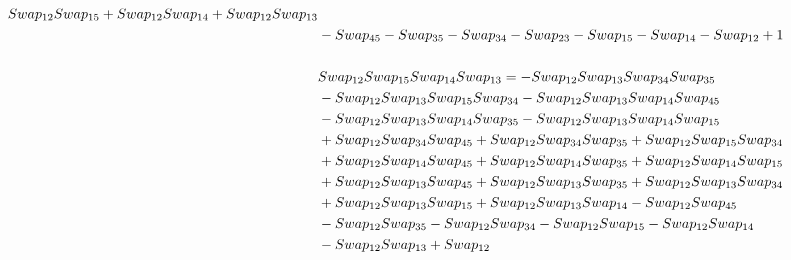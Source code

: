 \documentclass[10pt,a4paper]{amsart}
\begin{document}
\begin{align*}
        \textnormal{Swap}_{12} \textnormal{Swap}_{15} + \textnormal{Swap}_{12} \textnormal{Swap}_{14} + \textnormal{Swap}_{12} \textnormal{Swap}_{13}\\ & - \textnormal{Swap}_{45} - \textnormal{Swap}_{35} - \textnormal{Swap}_{34} - \textnormal{Swap}_{23} - \textnormal{Swap}_{15} - \textnormal{Swap}_{14} - \textnormal{Swap}_{12} +
        1\\
        \\
        &\textnormal{Swap}_{12}   \textnormal{Swap}_{15}   \textnormal{Swap}_{14}   \textnormal{Swap}_{13} = -\textnormal{Swap}_{12} \textnormal{Swap}_{13} \textnormal{Swap}_{34} \textnormal{Swap}_{35}\\ & - \textnormal{Swap}_{12} \textnormal{Swap}_{13} \textnormal{Swap}_{15} \textnormal{Swap}_{34} - \textnormal{Swap}_{12} \textnormal{Swap}_{13} \textnormal{Swap}_{14} \textnormal{Swap}_{45}\\ & - \textnormal{Swap}_{12} \textnormal{Swap}_{13} \textnormal{Swap}_{14} \textnormal{Swap}_{35} -
        \textnormal{Swap}_{12} \textnormal{Swap}_{13} \textnormal{Swap}_{14} \textnormal{Swap}_{15}\\ & + \textnormal{Swap}_{12} \textnormal{Swap}_{34} \textnormal{Swap}_{45} + \textnormal{Swap}_{12} \textnormal{Swap}_{34} \textnormal{Swap}_{35} + \textnormal{Swap}_{12} \textnormal{Swap}_{15} \textnormal{Swap}_{34}\\ & + \textnormal{Swap}_{12} \textnormal{Swap}_{14} \textnormal{Swap}_{45}
        + \textnormal{Swap}_{12} \textnormal{Swap}_{14} \textnormal{Swap}_{35} + \textnormal{Swap}_{12} \textnormal{Swap}_{14} \textnormal{Swap}_{15}\\ & + \textnormal{Swap}_{12} \textnormal{Swap}_{13} \textnormal{Swap}_{45} + \textnormal{Swap}_{12} \textnormal{Swap}_{13} \textnormal{Swap}_{35} + \textnormal{Swap}_{12} \textnormal{Swap}_{13} \textnormal{Swap}_{34}\\ & +
        \textnormal{Swap}_{12} \textnormal{Swap}_{13} \textnormal{Swap}_{15} + \textnormal{Swap}_{12} \textnormal{Swap}_{13} \textnormal{Swap}_{14} - \textnormal{Swap}_{12} \textnormal{Swap}_{45}\\ & - \textnormal{Swap}_{12} \textnormal{Swap}_{35} - \textnormal{Swap}_{12} \textnormal{Swap}_{34} - \textnormal{Swap}_{12} \textnormal{Swap}_{15} -
        \textnormal{Swap}_{12} \textnormal{Swap}_{14}\\ & - \textnormal{Swap}_{12} \textnormal{Swap}_{13} + \textnormal{Swap}_{12}\\
        \\ 

\end{align*}
\end{document}

